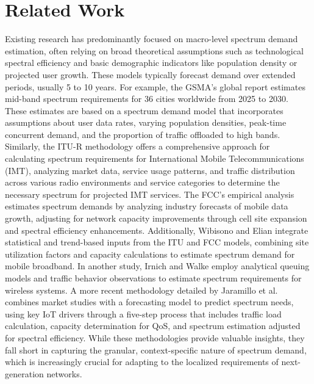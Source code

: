 \documentclass[conference]{IEEEtran}
\begin{document}
\section{Related Work}\label{Related Work}
Existing research has predominantly focused on macro-level spectrum demand estimation, often relying on broad theoretical assumptions such as technological spectral efficiency and basic demographic indicators like population density or projected user growth. These models typically forecast demand over extended periods, usually 5 to 10 years. For example, the GSMA's global report \cite{gsma2021_mid_band} estimates mid-band spectrum requirements for 36 cities worldwide from 2025 to 2030. These estimates are based on a spectrum demand model that incorporates assumptions about user data rates, varying population densities, peak-time concurrent demand, and the proportion of traffic offloaded to high bands. Similarly, the ITU-R methodology \cite{itu2013_m1768} offers a comprehensive approach for calculating spectrum requirements for International Mobile Telecommunications (IMT), analyzing market data, service usage patterns, and traffic distribution across various radio environments and service categories to determine the necessary spectrum for projected IMT services. The FCC's empirical analysis \cite{fcc2010_mobile_broadband} estimates spectrum demands by analyzing industry forecasts of mobile data growth, adjusting for network capacity improvements through cell site expansion and spectral efficiency enhancements. Additionally, Wibisono and Elian \cite{wibisono2015} integrate statistical and trend-based inputs from the ITU and FCC models, combining site utilization factors and capacity calculations to estimate spectrum demand for mobile broadband. In another study, Irnich and Walke \cite{irnich2004spectrum} employ analytical queuing models and traffic behavior observations to estimate spectrum requirements for wireless systems. A more recent methodology detailed by Jaramillo et al. \cite{jaramillo2021spectrum} combines market studies with a forecasting model to predict spectrum needs, using key IoT drivers through a five-step process that includes traffic load calculation, capacity determination for QoS, and spectrum estimation adjusted for spectral efficiency. While these methodologies provide valuable insights, they fall short in capturing the granular, context-specific nature of spectrum demand, which is increasingly crucial for adapting to the localized requirements of next-generation networks. 
\end{document}
